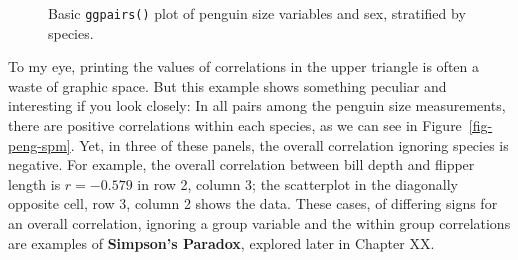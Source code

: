 \documentclass[
  letterpaper,
  10pt,
  krantz2]{krantz}
\begin{document}
\begin{figure}[H]


\caption{\label{fig-peng-ggpairs1}Basic \texttt{ggpairs()} plot of
penguin size variables and sex, stratified by species.}

\end{figure}%

To my eye, printing the values of correlations in the upper triangle is
often a waste of graphic space. But this example shows something
peculiar and interesting if you look closely: In all pairs among the
penguin size measurements, there are positive correlations within each
species, as we can see in Figure~\ref{fig-peng-spm}. Yet, in three of
these panels, the overall correlation ignoring species is negative. For
example, the overall correlation between bill depth and flipper length
is \(r = -0.579\) in row 2, column 3; the scatterplot in the diagonally
opposite cell, row 3, column 2 shows the data. These cases, of differing
signs for an overall correlation, ignoring a group variable and the
within group correlations are examples of \textbf{Simpson's Paradox},
explored later in Chapter XX.
\end{document}
